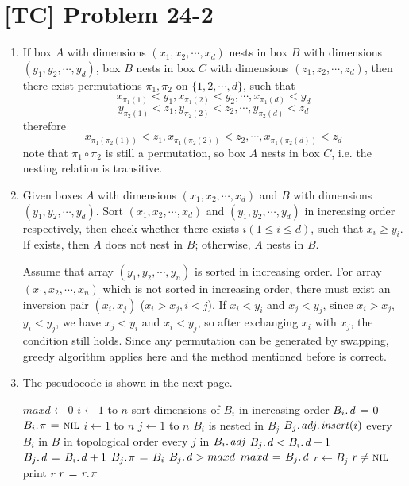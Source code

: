 \documentclass[a4paper,11pt,twocolumn]{article}
\newcommand{\NIL}{\const{nil}}
\begin{document}
  \section{[TC] Problem 24-2}
  \begin{enumerate}
  \item If box $A$ with dimensions $(x_1, x_2, \cdots, x_d)$ nests in box $B$ with dimensions $(y_1, y_2, \cdots, y_d)$, box $B$ nests in box $C$ with dimensions $(z_1, z_2, \cdots, z_d)$, then there exist permutations $\pi_1, \pi_2$ on $\{1, 2, \cdots, d\}$, such that
  $$ x_{\pi_1(1)} < y_1, x_{\pi_1(2)} < y_2, \cdots, x_{\pi_1(d)} < y_d $$
  $$ y_{\pi_2(1)} < z_1, y_{\pi_2(2)} < z_2, \cdots, y_{\pi_2(d)} < z_d $$
  therefore
  $$ x_{\pi_1(\pi_2(1))} < z_1, x_{\pi_1(\pi_2(2))} < z_2, \cdots, x_{\pi_1(\pi_2(d))} < z_d $$
  note that $\pi_1 \circ \pi_2$ is still a permutation, so box $A$ nests in box $C$, i.e. the nesting relation is transitive.
  \item Given boxes $A$ with dimensions $(x_1, x_2, \cdots, x_d)$ and $B$ with dimensions $(y_1, y_2, \cdots, y_d)$. Sort $(x_1, x_2, \cdots, x_d)$ and $(y_1, y_2, \cdots, y_d)$ in increasing order respectively, then check whether there exists $i (1 \leq i \leq d)$, such that $x_i \geq y_i$. If exists, then $A$ does not nest in $B$; otherwise, $A$ nests in $B$. \par
  Assume that array $(y_1, y_2, \cdots, y_n)$ is sorted in increasing order. For array $(x_1, x_2, \cdots, x_n)$ which is not sorted in increasing order, there must exist an inversion pair $(x_i, x_j)$ ($x_i>x_j, i<j$). If $x_i < y_i$ and $x_j < y_j$, since $x_i > x_j$, $y_i < y_j$, we have $x_j < y_i$ and $x_i < y_j$, so after exchanging $x_i$ with $x_j$, the condition still holds. Since any permutation can be generated by swapping, greedy algorithm applies here and the method mentioned before is correct.
  \item The pseudocode is shown in the next page.
  \begin{codebox}
  \li $maxd \gets 0$
  \li \For $i \gets 1$ to $n$
  \li \Do  sort dimensions of $B_i$ in increasing order
  \li      $\attrib{B_i}{d} \gets 0$
  \li      $\attrib{B_i}{\pi} \gets \NIL$
      \End
  \li \For $i \gets 1$ to $n$
  \li \Do  \For $j \gets 1$ to $n$
  \li      \Do  \If $B_i$ is nested in $B_j$
  \li           \Do $\attribb{B_j}{adj}{insert}(i)$
                \End
           \End
      \End
  \li \For every $B_i$ in $B$ in topological order
  \li \Do  \For every $j$ in $\attrib{B_i}{adj}$
  \li      \If  $\attrib{B_j}{d} < \attrib{B_i}{d} + 1$
  \li      \Do  $\attrib{B_j}{d} \gets \attrib{B_i}{d} + 1$
  \li           $\attrib{B_j}{\pi} \gets B_i$
  \li           \If $\attrib{B_j}{d} > maxd$
  \li           \Do $maxd \gets \attrib{B_j}{d}$
  \li               $r \gets B_j$
                \End
           \End
      \End
  \li \While $r \neq \NIL$
  \li \Do print $r$
  \li     $r \gets \attrib{r}{\pi}$
      \End
  \end{codebox}


\end{enumerate}
\end{document}
